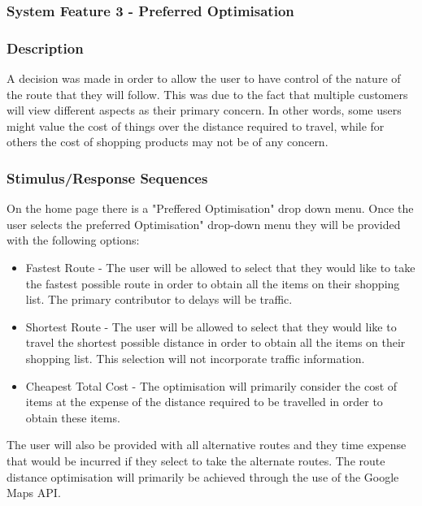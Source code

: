 \documentclass[10pt, a4paper, onecolumn]{scrartcl}
\begin{document}
		\subsubsection{System Feature 3 - Preferred Optimisation}
		
			\subsubsection*{Description}
			
				A decision was made in order to allow the user to have control of the nature of the route that they will follow. This was due to the fact that multiple customers will view different aspects as their primary concern. In other words, some users might value the cost of things over the distance required to travel, while for others the cost of shopping products may not be of any concern. 
			
			\subsubsection*{Stimulus/Response Sequences}
			
				On the home page there is a "Preffered Optimisation" drop down menu. Once the user selects the preferred Optimisation" drop-down menu they will be provided with the following options:
				
				\begin{itemize}
					\item Fastest Route - The user will be allowed to select that they would like to take the fastest possible route in order to obtain all the items on their shopping list. The primary contributor to delays will be traffic.
					\item Shortest Route - The user will be allowed to select that they would like to travel the shortest possible distance in order to obtain all the items on their shopping list. This selection will not incorporate traffic information.
					\item Cheapest Total Cost - The optimisation will primarily consider the cost of items at the expense of the distance required to be travelled in order to obtain these items. 
				\end{itemize}
				
				The user will also be provided with all alternative routes and they time expense that would be incurred if they select to take the alternate routes. The route distance optimisation will primarily be achieved through the use of the Google Maps API.
			
\end{document}
